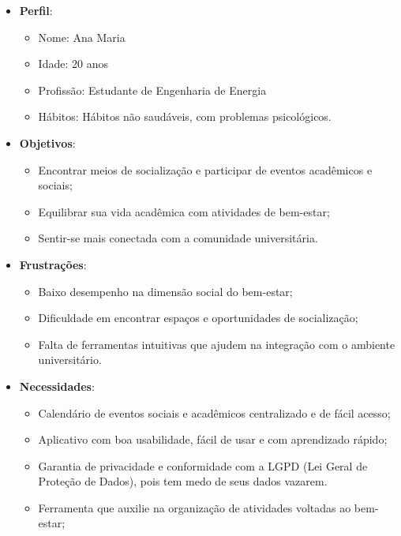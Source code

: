 \begin{itemize}
    \item \textbf{Perfil}:
    \begin{itemize}
        \item Nome: Ana Maria
        \item Idade: 20 anos
        \item Profissão: Estudante de Engenharia de Energia
        \item Hábitos: Hábitos não saudáveis, com problemas psicológicos.
    \end{itemize}


    \item \textbf{Objetivos}:
    \begin{itemize}
        \item Encontrar meios de socialização e participar de eventos acadêmicos e sociais;
        \item Equilibrar sua vida acadêmica com atividades de bem-estar;
        \item Sentir-se mais conectada com a comunidade universitária.
    \end{itemize}

    \item \textbf{Frustrações}:
    \begin{itemize}
        \item Baixo desempenho na dimensão social do bem-estar;
        \item Dificuldade em encontrar espaços e oportunidades de socialização;
        \item Falta de ferramentas intuitivas que ajudem na integração com o ambiente universitário.
    \end{itemize}

    \item \textbf{Necessidades}:
    \begin{itemize}
        \item Calendário de eventos sociais e acadêmicos centralizado e de fácil acesso;
        \item Aplicativo com boa usabilidade, fácil de usar e com aprendizado rápido;
        \item Garantia de privacidade e conformidade com a LGPD (Lei Geral de Proteção de Dados), pois tem medo de seus dados vazarem.
        \item Ferramenta que auxilie na organização de atividades voltadas ao bem-estar;
    \end{itemize}
\end{itemize}


